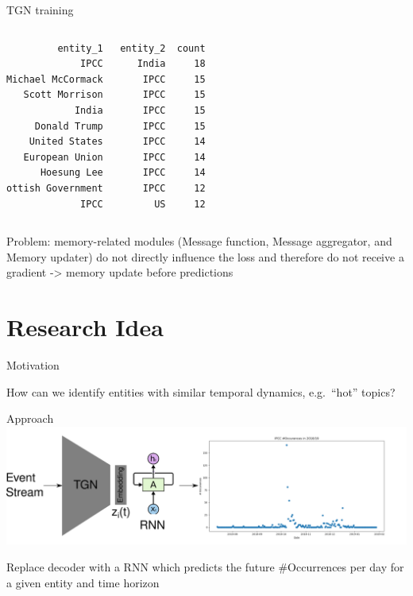 \documentclass[
  8pt,
  ignorenonframetext,
  aspectratio=43,
]{beamer}
\begin{document}
\begin{frame}[fragile]{TGN training}
{\begin{columns}[T]
\begin{column}{0.48\textwidth}
\begin{Verbatim}
         entity_1   entity_2  count
             IPCC      India     18
Michael McCormack       IPCC     15
   Scott Morrison       IPCC     15
            India       IPCC     15
     Donald Trump       IPCC     15
    United States       IPCC     14
   European Union       IPCC     14
      Hoesung Lee       IPCC     14
ottish Government       IPCC     12
             IPCC         US     12
\end{Verbatim}
  \end{column}
  \end{columns}}

Problem: memory-related modules (Message function, Message aggregator,
and Memory updater) do not directly influence the loss and therefore do
not receive a gradient -\textgreater{} memory update before predictions
\end{frame}

\hypertarget{research-idea}{%
\section{Research Idea}\label{research-idea}}

\begin{frame}{Motivation}
\protect\hypertarget{motivation}{}
\begin{block}{How can we identify entities with similar temporal
dynamics, e.g.~``hot'' topics?}
\protect\hypertarget{how-can-we-identify-entities-with-similar-temporal-dynamics-e.g.-hot-topics}{}
\end{block}
\end{frame}

\begin{frame}{Approach}
\protect\hypertarget{approach}{}
\includegraphics{motiviaton_arch.png}

Replace decoder with a RNN which predicts the future \#Occurrences per
day for a given entity and time horizon
\end{frame}
\end{document}
